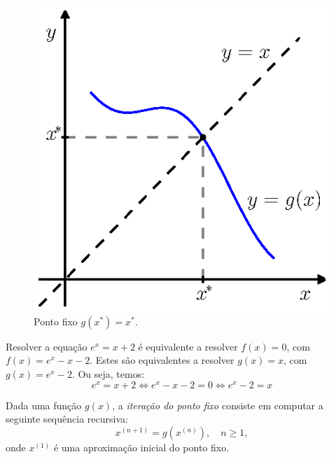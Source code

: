 \begin{figure}[h]
  \centering
  \includegraphics{./cap_equacao1d/pics/defn_ponto_fixo/defn_ponto_fixo.eps}
  \caption{Ponto fixo $g(x^*) = x^*$.}
  \label{fig:defn_ponto_fixo}
\end{figure}

\begin{ex}\label{ex:ponto_fixo_1}
  Resolver a equação $e^x = x + 2$ é equivalente a resolver $f(x) = 0$, com $f(x) = e^x - x - 2$. Estes são equivalentes a resolver $g(x) = x$, com $g(x) = e^x - 2$. Ou seja, temos:
  \begin{equation*}
    e^x = x + 2 \Leftrightarrow e^x - x - 2 = 0 \Leftrightarrow e^x - 2 = x
  \end{equation*}
\end{ex}

Dada uma função $g(x)$, a \emph{iteração do ponto fixo} consiste em computar a seguinte sequência recursiva:
\begin{equation*}
  x^{(n+1)} = g(x^{(n)}), \quad n\geq 1,
\end{equation*}
onde $x^{(1)}$ é uma aproximação inicial do ponto fixo.

